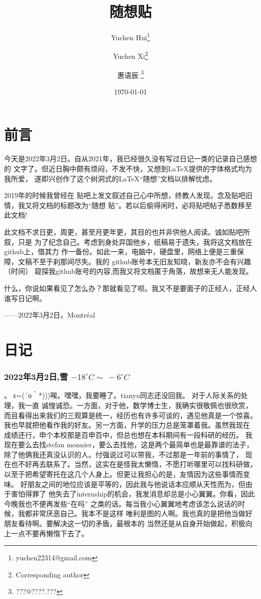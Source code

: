 \documentclass{ctexart}
\title{\textbf{\Huge{随想贴}}}
\author{Yuchen Hui\thanks{yuchen22314@gmail.com} 
\and Yuchen Xi\thanks{Corresponding author}
\and 惠语辰 \thanks{???@????.???}}
\date{\today}
\begin{document}
    \maketitle
    \tableofcontents
    \listoftables
    \listoffigures

    \newpage

    \part{前言}
    今天是2022年3月2日。自从2021年，我已经很久没有写过日记一类的记录自己感想的
    文字了。但近日胸中颇有烦闷，不发不快，又想到\LaTeX 提供的字体格式均为我所爱，
    遂即兴创作了这个树洞式的\LaTeX “随想”文档以排解忧虑。
    
    2019年的时候我曾经在
    贴吧上发文叙述自己心中所想，终教人发现。念及贴吧旧情，我又将文档的标题改为“随想
    贴”。若以后偷得闲时，必将贴吧帖子悉数移至此文档!
    
    此文档不求日更，周更，甚至月更年更，其目的也并非供他人阅读。诚如贴吧所叙，只是
    为了纪念自己。考虑到身处异国他乡，纸稿易于遗失，我将这文档放在github上，借其力
    作一备份。如此一来，电脑中，硬盘里，网络上便是三重保障，文稿不至于刹那间尽失。我的
    github账号本无旧友知晓，新友亦不会有兴趣（时间）
    窥探我github账号的内容,而我又将文档匿于角落，故想来无人能发现。
    
    什么，你说如果看见了怎么办？那就看见了呗。我又不是要面子的正经人，正经人谁写日记啊。
    \begin{flushright}
        ——2022年3月2日，Montréal
    \end{flushright}
    \part{日记}
    \section{2022年3月2日,雪 $-18^{\circ}C\sim~-6^{\circ}C$}。
    ε=(´ο｀*)))唉。嘿嘿，我要睡了。tianyu同志还没回我。
    对于人际关系的处理，我一直
    诚惶诚恐。一方面，对于他，数学博士生，我确实很敬佩也很欣赏，
    而且看得出来我们的三观算是统一，经历也有许多可谈的，遇见他真是一个惊喜。
    我也早就把他看作我的好友。另一方面，升学的压力总是笼罩着我。虽然我现在
    成绩还行，申个本校那是百申百中，但总也想在本科期间有一段科研的经历。
    我现在要么去找stefan monnier，要么去找他，这是两个最简单也是最靠谱的法子，
    除了他俩我还真没认识的人。付强说过可以带我，不过那是一年前的事情了，
    现在也不好再去联系了。当然，这实在是怪我太懒惰，不愿打听哪里可以找科研做，
    以至于把希望寄托在这几个人身上。但更让我担心的是，友情因为这些事情而变味。
    好朋友之间的地位应该是平等的，因此我与他说话本应顺从天性而为，但由于害怕得罪了
    他失去了internship的机会，我发消息却总是小心翼翼。你看，因此今晚我也不便再发些“在吗”
    之类的话。每当我小心翼翼地考虑该怎么说话的时候，我都非常厌恶自己。我本不是这样
    唯利是图的人啊。我也真的是把他当做好朋友看待啊。要解决这一切的矛盾，最根本的
    当然还是从自身开始做起，积极向上一点不要再懒惰下去了。
\end{document}
